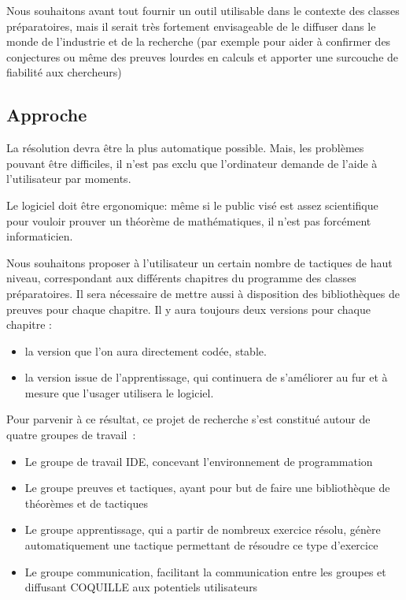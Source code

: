 \documentclass[a4paper,10pt]{article}
\begin{document}
Nous souhaitons avant tout fournir un outil utilisable dans le contexte des classes préparatoires, 
mais il serait très fortement envisageable de le diffuser dans le monde de l'industrie et de la recherche 
(par exemple pour aider à confirmer des conjectures ou même des preuves lourdes en calculs et apporter une surcouche de fiabilité aux chercheurs)

\subsection{Approche}

La résolution devra être la plus automatique possible. 
Mais, les problèmes pouvant être difficiles, il n'est pas exclu que l'ordinateur demande de l'aide à l'utilisateur par moments.

Le logiciel doit être ergonomique: même si le public visé est assez scientifique pour vouloir prouver un théorème de mathématiques, il n'est pas forcément informaticien.

Nous souhaitons proposer à l'utilisateur un certain nombre de tactiques de haut niveau, correspondant aux différents chapitres du programme des classes préparatoires. Il sera nécessaire de mettre aussi à disposition des bibliothèques de preuves pour chaque chapitre.
Il y aura toujours deux versions pour chaque chapitre :
\begin{itemize}
    \item la version que l'on aura directement codée, stable.
    \item la version issue de l'apprentissage, qui continuera de s'améliorer au fur et à mesure que l'usager utilisera le logiciel.
\end{itemize}

Pour parvenir à ce résultat, ce projet de recherche s’est constitué autour de quatre groupes de travail :

\begin{itemize} 
\item Le groupe de travail IDE, concevant l'environnement de programmation
\item Le groupe preuves et tactiques, ayant pour but de faire une bibliothèque de théorèmes et de tactiques
\item Le groupe apprentissage, qui a partir de nombreux exercice résolu, génère automatiquement une tactique permettant de résoudre ce type d'exercice
\item Le groupe communication, facilitant la communication entre les groupes et diffusant COQUILLE aux potentiels utilisateurs
\end{itemize}
\end{document}
